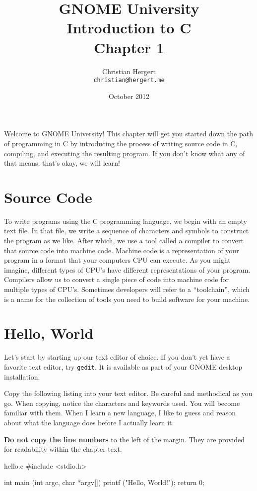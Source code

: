 \documentclass[12pt]{article}
\title{GNOME University \\
Introduction to C \\
Chapter 1}
\author{Christian Hergert \\
    \small \texttt{christian@hergert.me}
}
\date{October 2012}
\begin{document}
\maketitle

Welcome to GNOME University! This chapter will get you started down the path of
programming in C by introducing the process of writing source code in C,
compiling, and executing the resulting program. If you don't know what any of
that means, that's okay, we will learn!

\section{Source Code}

To write programs using the C programming language, we begin with an empty text
file. In that file, we write a sequence of characters and symbols to construct
the program as we like. After which, we use a tool called a compiler to convert
that source code into machine code. Machine code is a representation of your
program in a format that your computers CPU can execute. As you might imagine,
different types of CPU's have different representations of your program. Compilers
allow us to convert a single piece of code into machine code for multiple types
of CPU's. Sometimes developers will refer to a ``toolchain'', which is a name
for the collection of tools you need to build software for your machine.

\section{Hello, World}

Let's start by starting up our text editor of choice. If you don't yet have a
favorite text editor, try \verb|gedit|. It is available as part of your GNOME
desktop installation.

Copy the following listing into your text editor. Be careful and methodical as
you go. When copying, notice the characters and keywords used.  You will become
familiar with them. When I learn a new language, I like to guess and reason
about what the language does before I actually learn it.

\textbf{Do not copy the line numbers} to the left of the margin. They are
provided for readability within the chapter text.

\begin{code}{hello.c}
#include <stdio.h>

int
main (int   argc,
      char *argv[])
{
    printf ("Hello, World!\n");
    return 0;
}
\end{code}
\end{document}
